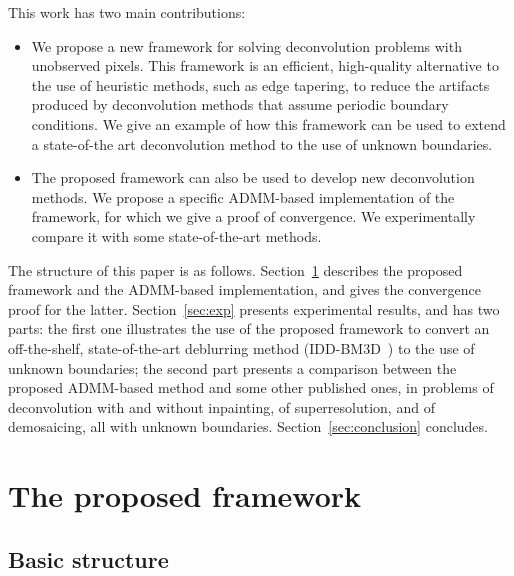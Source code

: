 \documentclass[10pt,twocolumn,twoside]{IEEEtran}
\begin{document}
This work has two main contributions:
\begin{itemize}
	\item We propose a new framework for solving deconvolution problems with unobserved pixels. This framework is an efficient, high-quality alternative to the use of heuristic methods, such as edge tapering, to reduce the artifacts produced by deconvolution methods that assume periodic boundary conditions.  We give an example of how this framework can be used to extend a state-of-the art deconvolution method to the use of unknown boundaries.

   \item The proposed framework can also be used to develop new deconvolution methods. We propose a specific ADMM-based implementation of the framework, for which we give a proof of convergence. We experimentally compare it with some state-of-the-art methods.
\end{itemize}

The structure of this paper is as follows. Section~\ref{sec:method} describes the proposed framework and the ADMM-based implementation, and gives the convergence proof for the latter. Section~\ref{sec:exp} presents experimental results, and has two parts: the first one illustrates the use of the proposed framework to convert an off-the-shelf, state-of-the-art deblurring method (IDD-BM3D~\cite{Danielyan2012}) to the use of unknown boundaries; the second part presents a comparison between the proposed ADMM-based method and some other published ones, in problems of deconvolution with and without inpainting, of superresolution, and of demosaicing, all with unknown boundaries. Section~\ref{sec:conclusion} concludes.


\section{The proposed framework} \label{sec:method}
\label{sec:framework}

\subsection{Basic structure}
\label{sec:basicstructure}
\end{document}
